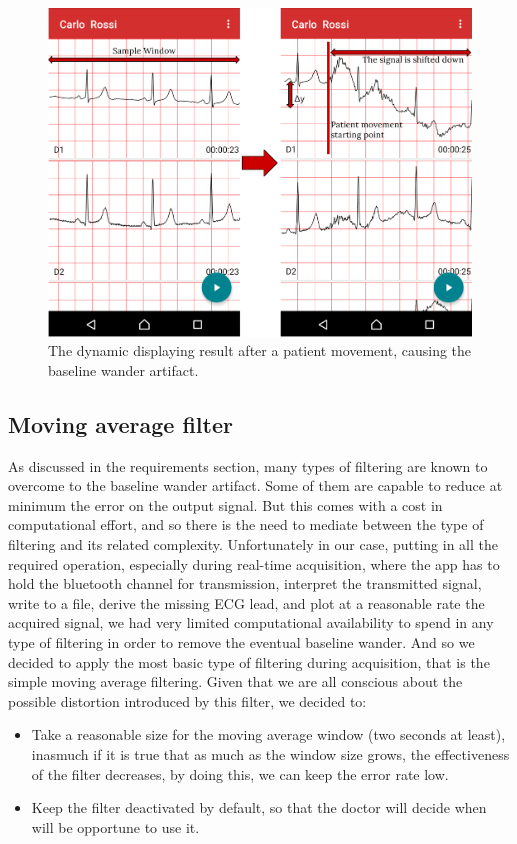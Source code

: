 \begin{figure}[ht!]
	\centering
	\includegraphics[width=130mm]{figures/ch7/4.png}
	\caption{The dynamic displaying result after a patient movement, causing the baseline wander artifact.}
	\label{fig7.4}
\end{figure}

\subsection{Moving average filter}
As discussed in the requirements section, many types of filtering are known to overcome to the baseline wander artifact. Some of them are capable to reduce at minimum the error on the output signal. But this comes with a cost in computational effort, and so there is the need to mediate between the type of filtering and its related complexity.
Unfortunately in our case, putting in all the required operation, especially during real-time acquisition, where the app has to hold the bluetooth channel for transmission, interpret the transmitted signal, write to a file, derive the missing ECG lead, and plot at a reasonable rate the acquired signal, we had very limited computational availability to spend in any type of filtering in order to remove the eventual baseline wander. And so we decided to apply the most basic type of filtering during acquisition, that is the simple moving average filtering. Given that we are all conscious about the possible distortion introduced by this filter, we decided to:
\begin{itemize}
	\item Take a reasonable size for the moving average window (two seconds at least), inasmuch if it is true that as much as the window size grows, the effectiveness of the filter decreases, by doing this, we can keep the error rate low.
	\item Keep the filter deactivated by default, so that the doctor will decide when will be opportune to use it.
\end{itemize}

